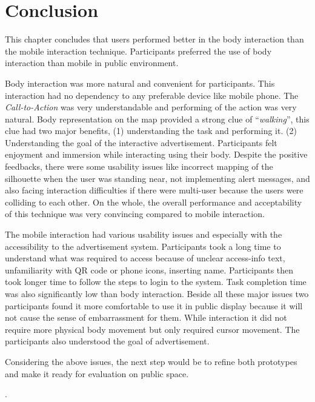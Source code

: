 \section{Conclusion}
This chapter concludes that users performed better in the body interaction than the mobile interaction technique. Participants preferred the use of body interaction than mobile in public environment.

Body interaction was more natural and convenient for participants. This interaction had no dependency to any preferable device like mobile phone. The \emph{Call-to-Action} was very understandable and performing of the action was very natural. Body representation on the map provided a strong clue of ``\emph{walking}'', this clue had two major benefits, (1) understanding the task and performing it. (2) Understanding the goal of the interactive advertisement. Participants felt enjoyment and immersion while interacting using their body. Despite the positive feedbacks, there were some usability issues like incorrect mapping of the silhouette when the user was standing near, not implementing alert messages, and also facing interaction difficulties if there were multi-user because the users were colliding to each other. On the whole, the overall performance and acceptability of this technique was very convincing compared to mobile interaction.


The mobile interaction had various usability issues and especially with the accessibility to the advertisement system. Participants took a long time to understand what was required to access because of unclear access-info text, unfamiliarity with QR code or phone icons, inserting name. Participants then took longer time to follow the steps to login to the system. Task completion time was also significantly low than body interaction.  Beside all these major issues two participants found it more comfortable to use it in public display because it will not cause the sense of embarrassment for them. While interaction it did not require more physical body movement but only required cursor movement. The participants also understood the goal of advertisement.

Considering the above issues, the next step would be to refine both prototypes and make it ready for evaluation on public space.


\newpage
.













